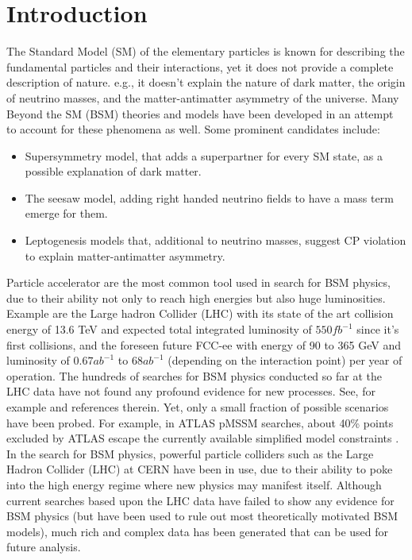 \documentclass[../ddppaper2.tex]{subfiles}
\begin{document}
\section{Introduction}

The Standard Model (SM) of the elementary particles \cite{Grossman_StandardModel_2023} is known for describing the fundamental particles and their interactions, yet it does not provide a complete description of nature. e.g., it doesn't explain the nature of dark matter, the origin of neutrino masses, and the matter-antimatter asymmetry of the universe. Many Beyond the SM (BSM) theories and models have been developed in an attempt to account for these phenomena as well. Some prominent candidates include:

\begin{itemize}
    \item Supersymmetry model, that adds a superpartner for every SM state, as a possible explanation of dark matter.
    \item The seesaw model, adding right handed neutrino fields to have a mass term emerge for them.
    \item Leptogenesis models that, additional to neutrino masses, suggest CP violation to explain matter-antimatter asymmetry.
\end{itemize}

Particle accelerator are the most common tool used in search for BSM physics, due to their ability not only to reach high energies but also huge luminosities. Example are the Large hadron Collider (LHC) \cite{CERN_Courier_LHC_Run3} with its state of the art collision energy of 13.6 TeV and expected total integrated luminosity of $550fb^{-1}$ since it's first collisions, and the foreseen future FCC-ee \cite{Benedikt_2026_FCC} with energy of 90 to 365 GeV and luminosity of $0.67ab^{-1}$ to $68ab^{-1}$ (depending on the interaction point) per year of operation. The hundreds of searches for BSM physics conducted so far at the LHC data have not found any profound evidence for new processes. See, for example \cite{PDG_2024} and references therein. Yet, only a small fraction of possible scenarios have been probed. For example, in ATLAS pMSSM searches, about 40\% points excluded by ATLAS escape the currently available simplified model constraints \cite{Ambrogi_2018_pMSSM_misses}. In the search for BSM physics, powerful particle colliders such as the Large Hadron Collider (LHC) at CERN have been in use, due to their ability to poke into the high energy regime where new physics may manifest itself. Although current searches based upon the LHC data have failed to show any evidence for BSM physics (but have been used to rule out most theoretically motivated BSM models), much rich and complex data has been generated that can be used for future analysis. 
\end{document}
